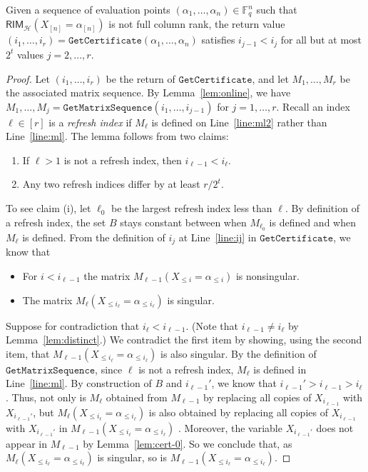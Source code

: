 \documentclass{article}[11pt]
\begin{document}
\begin{lemma}
  Given a sequence of evaluation points $(\alpha_1,\dots,\alpha_n) \in \mathbb{F}_q^n$ such that $\mathsf{RIM}_\mathcal{H}(X_{[n]} = \alpha_{[n]})$ is not full column rank, the return value $(i_1,\dots,i_r) = \mathtt{GetCertificate}(\alpha_1,\dots,\alpha_n)$ satisfies $i_{j-1} < i_j$ for all but at most $2^t$ values $j=2,\dots,r$.
  \label{lem:count}
\end{lemma}
\begin{proof}
  Let $(i_1,\dots,i_r)$ be the return of $\mathtt{GetCertificate}$, and let $M_1,\dots,M_r$ be the associated matrix sequence.
  By Lemma~\ref{lem:online}, we have $M_1,\dots,M_j = \mathtt{GetMatrixSequence}(i_1,\dots,i_{j-1})$ for $j=1,\dots,r$.
  Recall an index $\ell\in[r]$ is a \emph{refresh index} if $M_\ell$ is defined on Line~\ref{line:ml2} rather than Line~\ref{line:ml}.
  The lemma follows from two claims: 
  \begin{enumerate}
    \item[(i)] If $\ell>1$ is not a refresh index, then $i_{\ell-1}<i_\ell$.
    \item[(ii)] Any two refresh indices differ by at least $r/2^t$.
  \end{enumerate}

  To see claim (i), let $\ell_0$ be the largest refresh index less than $\ell$.
  By definition of a refresh index, the set $B$ stays constant between when $M_{\ell_0}$ is defined and when $M_{\ell}$ is defined.
  From the definition of $i_j$ at Line~\ref{line:ij} in $\mathtt{GetCertificate}$, we know that
  \begin{itemize}
    \item For $i< i_{\ell-1}$ the matrix $M_{\ell-1}(X_{\le i}=\alpha_{\le i})$ is nonsingular. 
    \item The matrix $M_{\ell}(X_{\le i_\ell}=\alpha_{\le i_\ell})$ is singular. 
  \end{itemize}
  Suppose for contradiction that $i_\ell < i_{\ell-1}$. (Note that $i_{\ell-1} \neq i_{\ell}$ by Lemma~\ref{lem:distinct}.)
  We contradict the first item by showing, using the second item, that $M_{\ell-1}(X_{\le i_\ell}=\alpha_{\le i_\ell})$ is also singular.
  By the definition of $\mathtt{GetMatrixSequence}$, since $\ell$ is not a refresh index, $M_\ell$ is defined in Line~\ref{line:ml}.
  By construction of $B$ and $i_{\ell-1}'$, we know that $i_{\ell-1}' > i_{\ell-1} > i_\ell$.
  Thus, not only is $M_\ell$ obtained from $M_{\ell-1}$ by replacing all copies of $X_{i_{\ell-1}}$ with $X_{i_{\ell-1}'}$, but $M_{\ell}(X_{\le i_\ell}=\alpha_{\le i_\ell})$ is also obtained by replacing all copies of $X_{i_{\ell-1}}$ with $X_{i_{\ell-1}'}$ in $M_{\ell-1}(X_{\le i_\ell}=\alpha_{\le i_\ell})$ .
  Moreover, the variable $X_{i_{\ell-1}'}$ does not appear in $M_{\ell-1}$ by Lemma~\ref{lem:cert-0}. So we conclude that, as $M_{\ell}(X_{\le i_\ell}=\alpha_{\le i_\ell})$ is singular, so is $M_{\ell-1}(X_{\le i_\ell}=\alpha_{\le i_\ell})$.


\end{proof}
\end{document}
